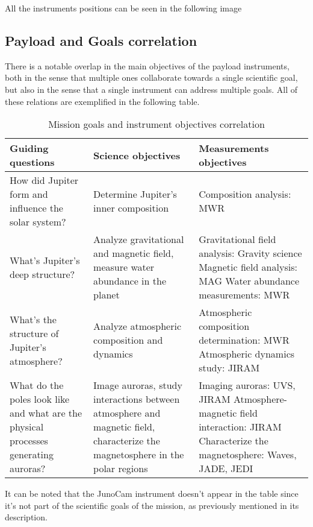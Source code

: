 All the instruments positions can be seen in the following image

\subsection{Payload and Goals correlation}
There is a notable overlap in the main objectives of the payload instruments, both in the sense that multiple ones collaborate towards a single scientific goal, but also in the sense that a single instrument can address multiple goals. All of these relations are exemplified in the following table.

\begin{table}[H]
    \renewcommand{\arraystretch}{1.5}
    \centering
    \begin{tabularx}{\linewidth}{|X|X|X|}
        \hline
        \textbf{Guiding questions} & \textbf{Science objectives} & \textbf{Measurements objectives} \\
        \hline
        \hline
        How did Jupiter form and influence the solar system? & Determine Jupiter's inner composition & Composition analysis: MWR \\ 
        \hline
        What's Jupiter's deep structure? & Analyze gravitational and magnetic field, measure water abundance in the planet & Gravitational field analysis: Gravity science \newline Magnetic field analysis: MAG \newline Water abundance measurements: MWR \\
        \hline
        What's the structure of Jupiter's atmosphere? & Analyze atmospheric composition and dynamics  & Atmospheric composition determination: MWR \newline Atmospheric dynamics study: JIRAM \\
        \hline
        What do the poles look like and what are the physical processes generating auroras? & Image auroras, study interactions between atmosphere and magnetic field, characterize the magnetosphere in the polar regions & Imaging auroras: UVS, JIRAM \newline Atmosphere-magnetic field interaction: JIRAM \newline Characterize the magnetosphere: Waves, JADE, JEDI \\
        \hline
    \end{tabularx}
    \caption{Mission goals and instrument objectives correlation}
\end{table}
It can be noted that the JunoCam instrument doesn't appear in the table since it's not part of the scientific goals of the mission, as previously mentioned in its description.  

